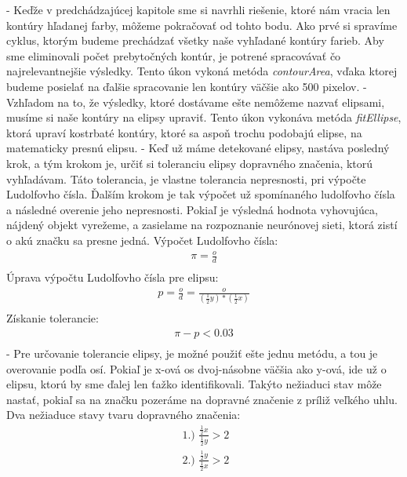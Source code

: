 \documentclass[12pt]{article}
\begin{document}
- Keďže v predchádzajúcej kapitole sme si navrhli riešenie, ktoré nám vracia len kontúry hľadanej farby, môžeme pokračovať od tohto bodu.
Ako prvé si spravíme cyklus, ktorým budeme prechádzať všetky naše vyhľadané kontúry farieb. Aby sme eliminovali počet prebytočných kontúr, 
je potrené spracovávať čo najrelevantnejšie výsledky. Tento úkon vykoná metóda \emph{contourArea}, vďaka ktorej budeme posielať na ďalšie spracovanie len kontúry väčšie ako 500 pixelov.
\linebreak
\linebreak
- Vzhľadom na to, že výsledky, ktoré dostávame ešte nemôžeme nazvať elipsami, musíme si naše kontúry na elipsy upraviť.
Tento úkon vykonáva metóda \emph{fitEllipse}, ktorá upraví kostrbaté kontúry, ktoré sa aspoň trochu podobajú elipse, na matematicky presnú elipsu.
\linebreak
\linebreak
- Keď už máme detekované elipsy, nastáva posledný krok, a tým krokom je, určiť si toleranciu elipsy dopravného značenia, ktorú vyhľadávam.
Táto tolerancia, je vlastne tolerancia nepresnosti, pri výpočte Ludolfovho čísla. 
Ďalším krokom je tak výpočet už spomínaného ludolfovho čísla a následné overenie jeho nepresnosti. 
Pokiaľ je výsledná hodnota vyhovujúca, nájdený objekt vyrežeme, a zasielame na rozpoznanie neurónovej sieti, ktorá zistí o akú značku sa presne jedná.
\linebreak
\linebreak
Výpočet Ludolfovho čísla:
\begin{align*}
          \pi = \frac{o}{d} \\
\end{align*}
Úprava výpočtu Ludolfovho čísla pre elipsu:
\begin{align*}
          p = \frac{o}{d} = \frac{o}{(\frac{1}{2} y) * ( \frac{1}{2} x)} \\
\end{align*}
Získanie tolerancie:
\begin{align*}
          \pi - p < 0.03 \\
\end{align*}
- Pre určovanie tolerancie elipsy, je možné použiť ešte jednu metódu, a tou je overovanie podľa osí. 
Pokiaľ je x-ová os dvoj-násobne väčšia ako y-ová, ide už o elipsu, ktorú by sme ďalej len ťažko identifikovali. 
Takýto nežiaduci stav môže nastať, pokiaľ sa na značku pozeráme na dopravné značenie z príliž veľkého uhlu.
\linebreak
\linebreak
Dva nežiaduce stavy tvaru dopravného značenia:
\begin{align*}
		  \text{ 1.) }
          \frac{\frac{1}{2} x}{\frac{1}{2} y} > 2  \\
          \text{ 2.) }
          \frac{\frac{1}{2} y}{\frac{1}{2} x} > 2  \\
\end{align*}
\end{document}
